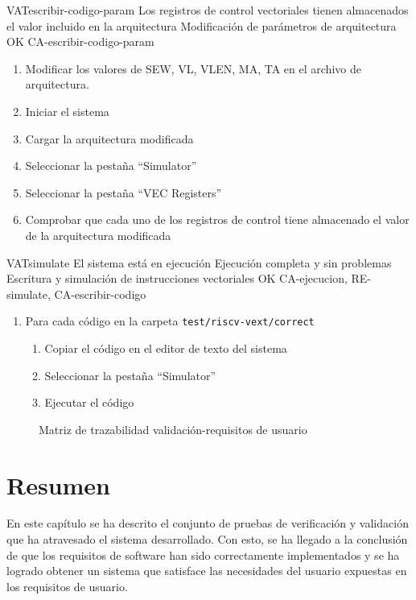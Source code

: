 \begin{testCase}{VAT}{escribir-codigo-param}
    {\NA}
    {Los registros de control vectoriales tienen almacenados el valor incluido en la arquitectura}
    {Modificación de parámetros de arquitectura} %
    {OK} %
    {CA-escribir-codigo-param}
    \begin{enumerate}
        \item Modificar los valores de SEW, VL, VLEN, MA, TA en el archivo de arquitectura.
        \item Iniciar el sistema
        \item Cargar la arquitectura modificada
        \item Seleccionar la pestaña ``Simulator''
        \item Seleccionar la pestaña ``VEC Registers''
        \item Comprobar que cada uno de los registros de control tiene almacenado el valor de la arquitectura modificada
    \end{enumerate}
\end{testCase}

\begin{testCase}{VAT}{simulate}
    {El sistema está en ejecución}
    {Ejecución completa y sin problemas}
    {Escritura y simulación de instrucciones vectoriales}
    {OK} %
    {CA-ejecucion, RE-simulate, CA-escribir-codigo}
    
    \begin{enumerate}
        \item Para cada código en la carpeta \texttt{test/riscv-vext/correct}
            \begin{enumerate}
                \item Copiar el código en el editor de texto del sistema
                \item Seleccionar la pestaña ``Simulator''
                \item Ejecutar el código
            \end{enumerate}
    \end{enumerate}
\end{testCase}

\FloatBarrier

\begin{figure}
    {\traceabilityVATUR}
    \caption{Matriz de trazabilidad validación-requisitos de usuario}\label{fig:traz-matrix-vat}
\end{figure}

\FloatBarrier

\section{Resumen}

En este capítulo se ha descrito el conjunto de pruebas de verificación y validación que ha atravesado el sistema desarrollado. Con esto, se ha llegado a la conclusión de que los requisitos de software han sido correctamente implementados y se ha logrado obtener un sistema que satisface las necesidades del usuario expuestas en los requisitos de usuario.

